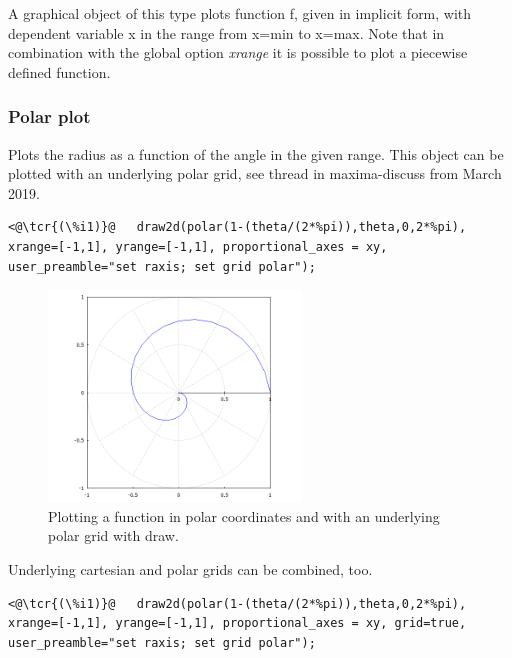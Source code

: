 \documentclass[../Maxima_Workbook.tex]{subfiles}
\begin{document}
\lz {}\hfill {}

\lz A graphical object of this type plots function f, given in implicit form, with dependent variable x in the range from x=min to x=max. Note that in combination with the global option \emph{xrange} it is possible to plot a piecewise defined function.

\subsubsection{Polar plot}

\lz {}\hfill {}

\lz Plots the radius as a function of the angle in the given range. This object can be plotted with an underlying polar grid, see thread in maxima-discuss from March 2019.

\lz \begin{lstlisting}
<@\tcr{(\%i1)}@   draw2d(polar(1-(theta/(2*%pi)),theta,0,2*%pi), xrange=[-1,1], yrange=[-1,1], proportional_axes = xy, user_preamble="set raxis; set grid polar");
\end{lstlisting}

\begin{figure}
	\centering
	\includegraphics[width=0.6\textwidth]{Pl_draw_polar_grid.png}
	\caption{Plotting a function in polar coordinates and with an underlying polar grid with draw.}
	\label{Pl-Fig12}
\end{figure}

\lz Underlying cartesian and polar grids can be combined, too.

\lz \begin{lstlisting}
<@\tcr{(\%i1)}@   draw2d(polar(1-(theta/(2*%pi)),theta,0,2*%pi), xrange=[-1,1], yrange=[-1,1], proportional_axes = xy, grid=true, user_preamble="set raxis; set grid polar");
\end{lstlisting}
\end{document}

